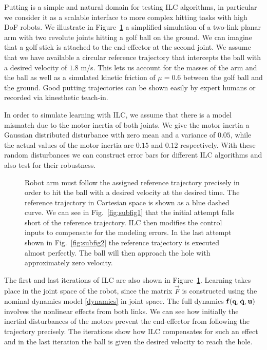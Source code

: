 Putting is a simple and natural domain for testing ILC algorithms, in particular we consider it as a scalable interface to more complex hitting tasks with high DoF robots. We illustrate in Figure~\ref{putting1} a simplified simulation of a two-link planar arm with two revolute joints hitting a golf ball on the ground. We can imagine that a golf stick is attached to the end-effector at the second joint. We assume that we have available a circular reference trajectory that intercepts the ball with a desired velocity of $1.8$ m/s. This lets us account for the masses of the arm and the ball as well as a simulated kinetic friction of $\mu = 0.6$ between the golf ball and the ground. Good putting trajectories can be shown easily by expert humans or recorded via kinesthetic teach-in. 

In order to simulate learning with ILC, we assume that there is a model mismatch due to the motor inertia of both joints. We give the motor inertia a Gaussian distributed disturbance with zero mean and a variance of $0.05$, while the actual values of the motor inertia are $0.15$ and $0.12$ respectively. With these random disturbances we can construct error bars for different ILC algorithms and also test for their robustness.

\begin{figure}[ht]
\centering
{}
\caption{Robot arm must follow the assigned reference trajectory precisely in order to hit the ball with a desired velocity at the desired time. The reference trajectory in Cartesian space is shown as a blue dashed curve. We can see in Fig.~\ref{fig:subfig1} that the initial attempt falls short of the reference trajectory. ILC then modifies the control inputs to compensate for the modeling errors. In the last attempt shown in Fig.~\ref{fig:subfig2} the reference trajectory is executed almost perfectly. The ball will then approach the hole with approximately zero velocity.} 
\label{putting1} 
\end{figure}

The first and last iterations of ILC are also shown in Figure~\ref{putting1}. Learning takes place in the joint space of the robot, since the matrix $\vec{F}$ is constructed using the nominal dynamics model \eqref{dynamics} in joint space. The full dynamics $\boldsymbol{\mathrm{f}}(\boldsymbol{\mathrm{q}},\dot{\boldsymbol{\mathrm{q}}},\boldsymbol{\mathrm{u}})$ involves the nonlinear effects from both links. We can see how initially the inertial disturbances of the motors prevent the end-effector from following the trajectory precisely. The iterations show how ILC compensates for such an effect and in the last iteration the ball is given the desired velocity to reach the hole. 

